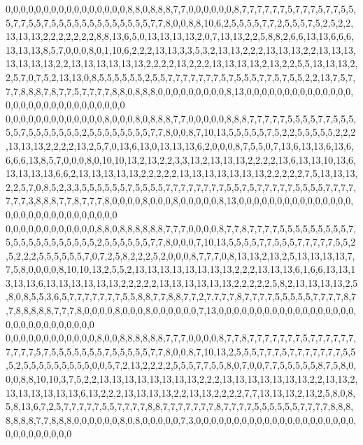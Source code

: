0,0,0,0,0,0,0,0,0,0,0,0,0,0,0,0,8,8,0,8,8,8,7,7,0,0,0,0,0,0,8,7,7,7,7,7,7,5,7,7,7,5,7,7,5,5,5,7,7,5,5,7,5,5,5,5,5,5,5,5,5,5,5,5,5,7,7,8,0,0,8,8,10,6,2,5,5,5,5,7,7,2,5,5,5,7,5,2,5,2,2,13,13,13,2,2,2,2,2,2,2,8,8,13,6,5,0,13,13,13,13,2,0,7,13,13,2,2,5,8,8,2,6,6,13,13,6,6,6,13,13,13,8,5,7,0,0,0,8,0,1,10,6,2,2,2,13,13,3,3,5,3,2,13,13,2,2,2,13,13,13,2,2,13,13,13,13,13,13,13,2,2,13,13,13,13,13,13,2,2,2,2,13,2,2,2,13,13,13,13,2,13,2,2,5,5,13,13,13,2,2,5,7,0,7,5,2,13,13,0,8,5,5,5,5,5,5,2,5,5,7,7,7,7,7,7,7,5,7,5,5,5,7,7,5,7,5,5,2,2,13,7,5,7,7,7,8,8,8,7,8,7,7,5,7,7,7,7,8,8,0,8,8,8,0,0,0,0,0,0,0,0,0,8,13,0,0,0,0,0,0,0,0,0,0,0,0,0,0,0,0,0,0,0,0,0,0,0,0,0,0,0,0,0,0
0,0,0,0,0,0,0,0,0,0,0,0,0,8,0,0,0,8,0,8,8,8,7,7,0,0,0,0,0,8,8,8,7,7,7,7,7,5,5,5,5,7,7,5,5,5,5,5,7,5,5,5,5,5,5,5,2,5,5,5,5,5,5,5,5,7,7,8,0,0,8,7,10,13,5,5,5,5,5,7,5,2,2,5,5,5,5,5,2,2,2,13,13,13,2,2,2,2,13,2,5,7,0,13,6,13,0,13,13,13,6,2,0,0,0,8,7,5,5,0,7,13,6,13,13,6,13,6,6,6,6,13,8,5,7,0,0,0,8,0,10,10,13,2,13,2,2,3,3,13,2,13,13,13,2,2,2,2,13,6,13,13,10,13,6,13,13,13,13,6,6,2,13,13,13,13,13,2,2,2,2,2,13,13,13,13,13,13,13,2,2,2,2,2,7,5,13,13,13,2,2,5,7,0,8,5,2,3,3,5,5,5,5,5,5,7,5,5,5,5,7,7,7,7,7,7,7,7,5,5,7,5,7,7,7,7,7,5,5,5,5,7,7,7,7,7,7,7,3,8,8,8,7,7,8,7,7,7,8,0,0,0,0,8,0,0,0,8,0,0,0,0,0,8,13,0,0,0,0,0,0,0,0,0,0,0,0,0,0,0,0,0,0,0,0,0,0,0,0,0,0,0,0,0,0
0,0,0,0,0,0,0,0,0,0,0,0,8,8,0,8,8,8,8,8,8,7,7,7,0,0,0,0,8,7,7,8,7,7,7,7,5,5,5,5,5,5,5,5,5,7,5,5,5,5,5,5,5,5,5,5,5,5,2,5,5,5,5,5,5,7,7,8,0,0,0,7,10,13,5,5,5,5,7,7,5,5,5,7,7,7,7,7,5,5,2,5,2,2,2,5,5,5,5,5,5,7,0,7,2,5,8,2,2,2,5,2,0,0,0,8,7,7,7,0,8,13,13,2,13,2,5,13,13,13,13,7,7,5,8,0,0,0,0,8,10,10,13,2,5,5,2,13,13,13,13,13,13,13,13,2,2,2,13,13,13,6,1,6,6,13,13,13,13,13,6,13,13,13,13,13,13,2,2,2,2,2,13,13,13,13,13,13,2,2,2,2,2,5,8,2,13,13,13,13,2,5,8,0,8,5,5,3,6,5,7,7,7,7,7,7,7,5,5,8,8,7,7,8,8,7,7,2,7,7,7,7,8,7,7,7,7,5,5,5,5,5,7,7,7,7,8,7,7,8,8,8,8,8,7,7,7,8,0,0,0,0,8,0,0,0,8,0,0,0,0,0,0,7,13,0,0,0,0,0,0,0,0,0,0,0,0,0,0,0,0,0,0,0,0,0,0,0,0,0,0,0,0,0,0
0,0,0,0,0,0,0,0,0,0,0,0,8,0,0,8,8,8,8,8,8,7,7,7,0,0,0,0,8,7,7,8,7,7,7,7,7,7,7,5,7,7,7,7,7,7,7,7,7,7,5,7,5,5,5,5,5,5,5,7,5,5,5,5,5,7,7,8,0,0,8,7,10,13,2,5,5,5,7,7,7,5,7,7,7,7,7,7,7,5,5,5,2,5,5,5,5,5,5,5,5,5,0,0,5,7,2,13,2,2,2,2,5,5,5,7,7,5,5,8,0,7,0,0,7,7,5,5,5,5,5,8,7,5,8,0,0,0,8,8,10,10,3,7,5,2,2,13,13,13,13,13,13,13,13,2,2,2,13,13,13,13,13,13,13,2,2,13,13,2,13,13,13,13,13,13,6,13,2,2,2,13,13,13,13,2,2,13,13,2,2,2,2,7,7,13,13,13,2,13,2,5,8,0,8,5,8,13,6,7,2,5,7,7,7,7,7,5,5,7,7,7,7,8,8,7,7,7,7,7,7,7,8,7,7,7,7,5,5,5,5,5,5,7,7,7,7,8,8,8,8,8,8,8,7,7,8,8,8,0,0,0,0,0,0,8,0,8,0,0,0,0,0,7,3,0,0,0,0,0,0,0,0,0,0,0,0,0,0,0,0,0,0,0,0,0,0,0,0,0,0,0,0,0,0
